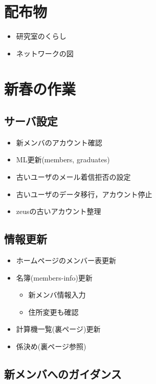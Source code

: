 \documentclass[twocolumn,11pt]{jsarticle}
\begin{document}

\setcounter{page}{1}


\section*{配布物}
\begin{itemize}
\item 研究室のくらし
\item ネットワークの図
\end{itemize}

\section{新春の作業}

\subsection{サーバ設定}
\begin{itemize}
\item 新メンバのアカウント確認
\item ML更新(members, graduates)
\item 古いユーザのメール着信拒否の設定
\item 古いユーザのデータ移行，アカウント停止
\item zeusの古いアカウント整理
\end{itemize}

\subsection{情報更新}
\begin{itemize}
\item ホームページのメンバー表更新
\item 名簿(members-info)更新
  \begin{itemize}
  \item 新メンバ情報入力
  \item 住所変更も確認
  \end{itemize}
\item 計算機一覧(裏ページ)更新
\item 係決め(裏ページ参照)
\end{itemize}

\subsection{新メンバへのガイダンス}
\end{document}
